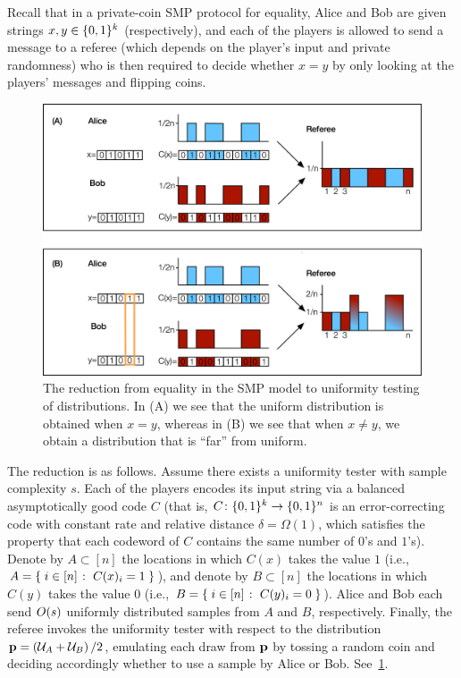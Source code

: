  Recall that in a private-coin SMP protocol for equality, Alice and Bob are given strings $x,y \in \{0,1\}^k$ (respectively), and each of the players is allowed to send a message to a referee (which depends on the player's input and private randomness) who is then required to decide whether $x=y$ by only looking at the players' messages and flipping coins.
 
 \begin{figure}[ht!]
  \centering
  \includegraphics[scale=0.8]{chapter2/img_uniformity.png}
  \caption{{The reduction from equality in the SMP model to uniformity testing of distributions.} In (A) we see that the uniform distribution is obtained when $x=y$, whereas in (B) we see that when $x \neq y$, we obtain a distribution that is ``far'' from uniform.}
  \label{fig:uniformity}
\end{figure}

The reduction is as follows. Assume there exists a uniformity tester with sample complexity $s$. Each of the players encodes its input string via a balanced asymptotically good code $C$ (that is, $C\colon\{0,1\}^k \to \{0,1\}^n$ is an error-correcting code with constant rate and relative distance $\delta = \Omega(1)$, which satisfies the property that each codeword of $C$ contains the same number of $0$'s and $1$'s). Denote by $A \subset [n]$ the locations in which $C(x)$ takes the value $1$ (i.e., $A = \left\{\;  i\in[n]  \;\colon\;  C(x)_i = 1 \; \right\}$), and denote by $B \subset [n]$ the locations in which $C(y)$ takes the value $0$ (i.e., $B = \left\{\;  i\in[n]  \;\colon\;  C(y)_i = 0 \; \right\}$). Alice and Bob each send $\bigO{s}$ uniformly distributed samples from $A$ and $B$, respectively. Finally, the referee invokes the uniformity tester with respect to the distribution $\mathbf{p}= \left( \mathcal{U}_{A}+ \mathcal{U}_{B} \right)/2$, emulating each draw from $\mathbf{p}$ by tossing a random coin and deciding accordingly whether to use a sample by Alice or Bob. See~\cref{fig:uniformity}.

